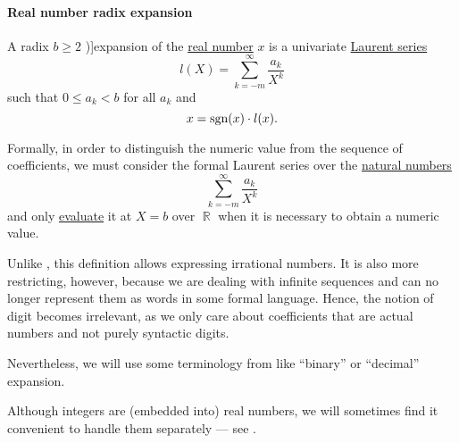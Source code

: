 \paragraph{Real number radix expansion}

\begin{definition}\label{def:real_number_radix_expansion}
  A radix \( b \geq 2 \) \term[en=expansion (\cite[260]{Rosen2019DiscreteMathematics})]{expansion} of the \hyperref[def:real_numbers]{real number} \( x \) is a univariate \hyperref[def:formal_laurent_series]{Laurent series}
  \begin{equation}\label{eq:def:positional_number_system/expansion}
    l(X) = \sum_{k=-m}^\infty \frac {a_k} {X^k}
  \end{equation}
  such that \( 0 \leq a_k < b \) for all \( a_k \) and
  \begin{equation*}
    x = \operatorname{sgn}(x) \cdot l(x).
  \end{equation*}
\end{definition}
\begin{comments}
  \item Formally, in order to distinguish the numeric value from the sequence of coefficients, we must consider the formal Laurent series over the \hyperref[def:natural_numbers]{natural numbers}
  \begin{equation*}
    \sum_{k=-m}^\infty \frac {a_k} {X^k}
  \end{equation*}
  and only \hyperref[con:evaluation_homomorphism]{evaluate} it at \( X = b \) over \( \BbbR \) when it is necessary to obtain a numeric value.

  \item Unlike , this definition allows expressing irrational numbers. It is also more restricting, however, because we are dealing with infinite sequences and can no longer represent them as words in some formal language. Hence, the notion of digit becomes irrelevant, as we only care about coefficients that are actual numbers and not purely syntactic digits.

  Nevertheless, we will use some terminology from  like \enquote{binary} or \enquote{decimal} expansion.

  \item Although integers are (embedded into) real numbers, we will sometimes find it convenient to handle them separately --- see .
\end{comments}

